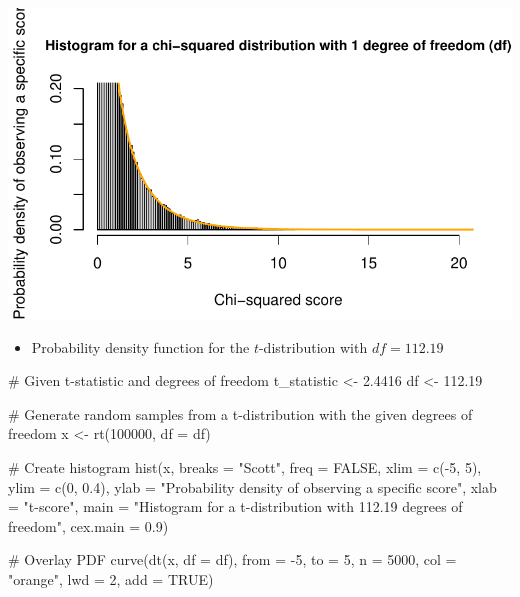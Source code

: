 \documentclass[
  11pt,
  letterpaper,
  DIV=11,
  numbers=noendperiod]{scrreprt}
\newenvironment{Shaded}{\begin{snugshade}}{\end{snugshade}}
\newcommand{\AttributeTok}[1]{\textcolor[rgb]{0.40,0.45,0.13}{#1}}
\newcommand{\CommentTok}[1]{\textcolor[rgb]{0.37,0.37,0.37}{#1}}
\newcommand{\ConstantTok}[1]{\textcolor[rgb]{0.56,0.35,0.01}{#1}}
\newcommand{\DecValTok}[1]{\textcolor[rgb]{0.68,0.00,0.00}{#1}}
\newcommand{\FloatTok}[1]{\textcolor[rgb]{0.68,0.00,0.00}{#1}}
\newcommand{\FunctionTok}[1]{\textcolor[rgb]{0.28,0.35,0.67}{#1}}
\newcommand{\NormalTok}[1]{\textcolor[rgb]{0.00,0.23,0.31}{#1}}
\newcommand{\OtherTok}[1]{\textcolor[rgb]{0.00,0.23,0.31}{#1}}
\newcommand{\SpecialCharTok}[1]{\textcolor[rgb]{0.37,0.37,0.37}{#1}}
\newcommand{\StringTok}[1]{\textcolor[rgb]{0.13,0.47,0.30}{#1}}
\providecommand{\tightlist}{%
  \setlength{\itemsep}{0pt}\setlength{\parskip}{0pt}}\usepackage{longtable,booktabs,array}
\begin{document}
\includegraphics{Hypothesis_testing_files/figure-pdf/unnamed-chunk-4-1.pdf}

\begin{itemize}
\tightlist
\item
  Probability density function for the \(t\)-distribution with
  \(df = 112.19\)
\end{itemize}

\begin{Shaded}
\begin{Highlighting}[]
\CommentTok{\# Given t{-}statistic and degrees of freedom}
\NormalTok{t\_statistic }\OtherTok{\textless{}{-}} \FloatTok{2.4416}
\NormalTok{df }\OtherTok{\textless{}{-}} \FloatTok{112.19}

\CommentTok{\# Generate random samples from a t{-}distribution with the given degrees of freedom}
\NormalTok{x }\OtherTok{\textless{}{-}} \FunctionTok{rt}\NormalTok{(}\DecValTok{100000}\NormalTok{, }\AttributeTok{df =}\NormalTok{ df)}

\CommentTok{\# Create histogram}
\FunctionTok{hist}\NormalTok{(x,}
     \AttributeTok{breaks =} \StringTok{"Scott"}\NormalTok{,}
     \AttributeTok{freq =} \ConstantTok{FALSE}\NormalTok{,}
     \AttributeTok{xlim =} \FunctionTok{c}\NormalTok{(}\SpecialCharTok{{-}}\DecValTok{5}\NormalTok{, }\DecValTok{5}\NormalTok{),}
     \AttributeTok{ylim =} \FunctionTok{c}\NormalTok{(}\DecValTok{0}\NormalTok{, }\FloatTok{0.4}\NormalTok{),}
     \AttributeTok{ylab =} \StringTok{"Probability density of observing a specific score"}\NormalTok{,}
     \AttributeTok{xlab =} \StringTok{"t{-}score"}\NormalTok{,}
     \AttributeTok{main =} \StringTok{"Histogram for a t{-}distribution with 112.19 degrees of freedom"}\NormalTok{,}
     \AttributeTok{cex.main =} \FloatTok{0.9}\NormalTok{)}

\CommentTok{\# Overlay PDF}
\FunctionTok{curve}\NormalTok{(}\FunctionTok{dt}\NormalTok{(x, }\AttributeTok{df =}\NormalTok{ df), }\AttributeTok{from =} \SpecialCharTok{{-}}\DecValTok{5}\NormalTok{, }\AttributeTok{to =} \DecValTok{5}\NormalTok{, }\AttributeTok{n =} \DecValTok{5000}\NormalTok{, }\AttributeTok{col =} \StringTok{"orange"}\NormalTok{, }\AttributeTok{lwd =} \DecValTok{2}\NormalTok{, }\AttributeTok{add =} \ConstantTok{TRUE}\NormalTok{)}
\end{Highlighting}
\end{Shaded}
\end{document}
